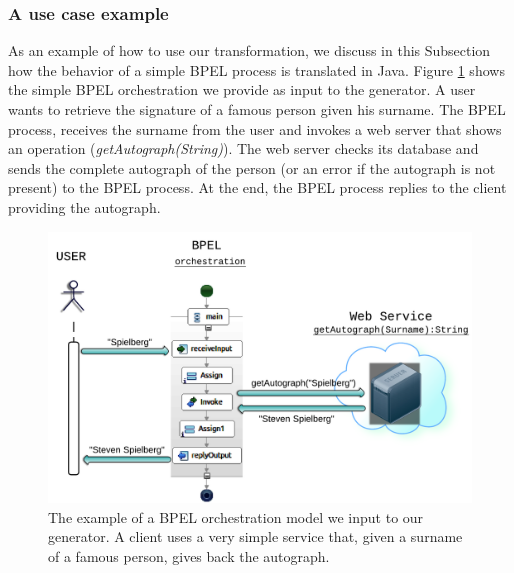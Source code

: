 \subsubsection{A use case example}
As an example of how to use our transformation, we discuss in this Subsection how the behavior of a simple BPEL process is translated in Java. Figure \ref{fig:BPELOrchestr} shows the simple BPEL orchestration we provide as input to the generator. A user wants to retrieve the signature of a famous person given his surname. The BPEL process, receives the surname from the user and invokes a web server that shows an operation (\textit{getAutograph(String)}). The web server checks its database and sends the complete autograph of the person (or an error if the autograph is not present) to the BPEL process. At the end, the BPEL process replies to the client providing the autograph.
\begin{figure}
  \begin{center}
    \includegraphics[scale=1.2]{pictures/UseCaseExampleBPELOrchestr.png}
    \caption{The example of a BPEL orchestration model we input to our generator. A client uses a very simple service that, given a surname of a famous person, gives back the autograph.}
    \label{fig:BPELOrchestr}
  \end{center}
\end{figure}

